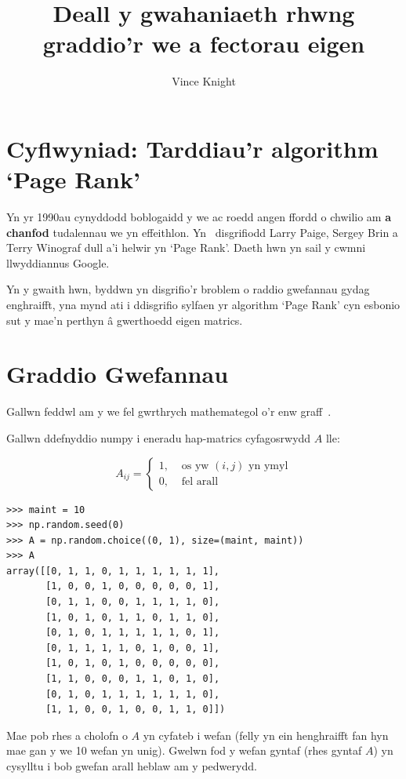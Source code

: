 \documentclass[a4paper]{article}
\title{Deall y gwahaniaeth rhwng graddio'r we a fectorau eigen}
\author{Vince Knight}
\date{}
\begin{document}
\maketitle

\section{Cyflwyniad: Tarddiau'r algorithm `Page Rank'}

Yn yr 1990au cynyddodd boblogaidd y we ac roedd angen ffordd o chwilio am
\textbf{a chanfod} tudalennau we yn effeithlon. Yn~\cite{page1999pagerank}
disgrifiodd Larry Paige, Sergey Brin a Terry Winograf dull a'i helwir yn `Page
Rank'. Daeth hwn yn sail y cwmni llwyddiannus Google.

Yn y gwaith hwn, byddwn yn disgrifio'r broblem o raddio gwefannau gydag
enghraifft, yna mynd ati i ddisgrifio sylfaen yr algorithm `Page Rank' cyn
esbonio sut y mae'n perthyn \^{a} gwerthoedd eigen matrics.


\section{Graddio Gwefannau}\label{sec:ranking_pages}

Gallwn feddwl am y we fel gwrthrych mathemategol o'r enw
graff~\cite{diestel2005graph}.

Gallwn ddefnyddio numpy i eneradu hap-matrics cyfagosrwydd \(A\) lle:

\[
    A_{ij}
    =
    \begin{cases}
        1,&\text{ os yw }(i,j) \text{ yn ymyl}\\
        0,&\text{ fel arall}
    \end{cases}
\]

\begin{verbatim}
>>> maint = 10
>>> np.random.seed(0)
>>> A = np.random.choice((0, 1), size=(maint, maint))
>>> A
array([[0, 1, 1, 0, 1, 1, 1, 1, 1, 1],
       [1, 0, 0, 1, 0, 0, 0, 0, 0, 1],
       [0, 1, 1, 0, 0, 1, 1, 1, 1, 0],
       [1, 0, 1, 0, 1, 1, 0, 1, 1, 0],
       [0, 1, 0, 1, 1, 1, 1, 1, 0, 1],
       [0, 1, 1, 1, 1, 0, 1, 0, 0, 1],
       [1, 0, 1, 0, 1, 0, 0, 0, 0, 0],
       [1, 1, 0, 0, 0, 1, 1, 0, 1, 0],
       [0, 1, 0, 1, 1, 1, 1, 1, 1, 0],
       [1, 1, 0, 0, 1, 0, 0, 1, 1, 0]])
\end{verbatim}

Mae pob rhes a cholofn o \(A\) yn cyfateb i wefan (felly yn ein henghraifft fan
hyn mae gan y we 10 wefan yn unig). Gwelwn fod y wefan gyntaf (rhes gyntaf
\(A\)) yn cysylltu i bob gwefan arall heblaw am y pedwerydd.
\end{document}
